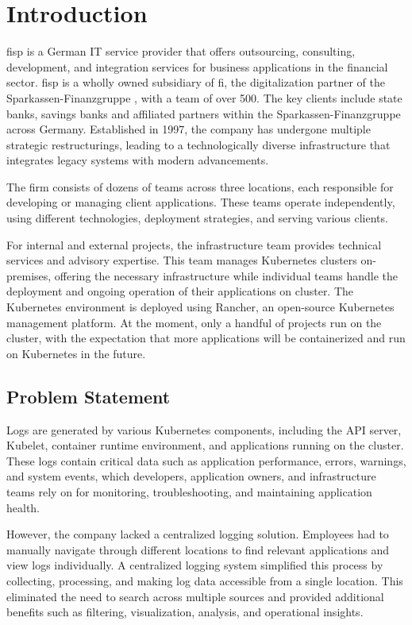 \documentclass[../main.tex]{subfiles}
\begin{document}
\chapter{Introduction}

\gls{fisp} \cite{fisp} is a German IT service provider that offers outsourcing, consulting, development, and integration services for business applications in the financial sector. \gls{fisp} is a wholly owned subsidiary of \gls{fi}, the digitalization partner of the Sparkassen-Finanzgruppe \cite{spfi}, with a team of over 500.  The key clients include state banks, savings banks and affiliated partners within the Sparkassen-Finanzgruppe across Germany. Established in 1997, the company has undergone multiple strategic restructurings, leading to a technologically diverse infrastructure that integrates legacy systems with modern advancements.

The firm consists of dozens of teams across three locations, each responsible for developing or managing client applications. These teams operate independently, using different technologies, deployment strategies, and serving various clients.

For internal and external projects, the infrastructure team provides technical services and advisory expertise. This team manages Kubernetes clusters on-premises, offering the necessary infrastructure while individual teams handle the deployment and ongoing operation of their applications on cluster. The Kubernetes environment is deployed using Rancher, an open-source Kubernetes management platform. At the moment, only a handful of projects run on the cluster, with the expectation that more applications will be containerized and run on Kubernetes in the future.

\section{Problem Statement}

Logs are generated by various Kubernetes components, including the API server, Kubelet, container runtime environment, and applications running on the cluster. These logs contain critical data such as application performance, errors, warnings, and system events, which developers, application owners, and infrastructure teams rely on for monitoring, troubleshooting, and maintaining application health.

However, the company lacked a centralized logging solution. Employees had to manually navigate through different locations to find relevant applications and view logs individually. A centralized logging system simplified this process by collecting, processing, and making log data accessible from a single location. This eliminated the need to search across multiple sources and provided additional benefits such as filtering, visualization, analysis, and operational insights.
\end{document}
